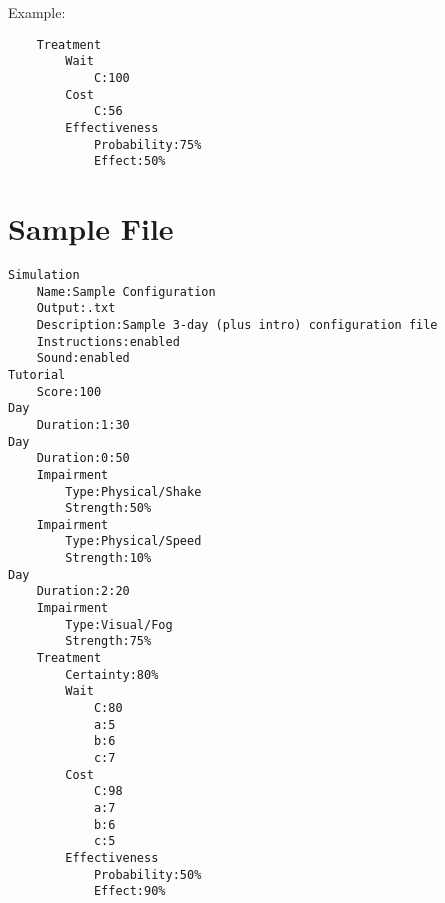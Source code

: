 \documentclass{article}
\begin{document}
\noindent Example: 
\begin{lstlisting}
    Treatment
        Wait
            C:100
        Cost
            C:56
        Effectiveness
            Probability:75%
            Effect:50%
\end{lstlisting}
    
    
\section{Sample File}
\begin{lstlisting}
Simulation
    Name:Sample Configuration
    Output:.txt
    Description:Sample 3-day (plus intro) configuration file  
    Instructions:enabled
    Sound:enabled
Tutorial
    Score:100
Day
    Duration:1:30
Day
    Duration:0:50
    Impairment
        Type:Physical/Shake
        Strength:50%
    Impairment
        Type:Physical/Speed
        Strength:10%
Day
    Duration:2:20
    Impairment
        Type:Visual/Fog
        Strength:75%
    Treatment
        Certainty:80%
        Wait
            C:80
            a:5
            b:6
            c:7
        Cost
            C:98
            a:7
            b:6
            c:5
        Effectiveness
            Probability:50%
            Effect:90%
\end{lstlisting}    
    
\end{document}
